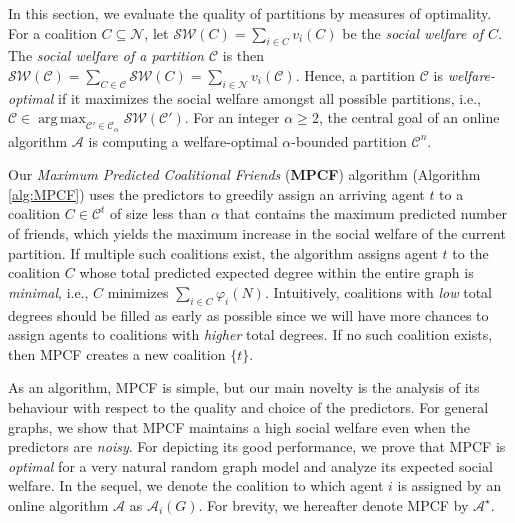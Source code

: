 \documentclass[letterpaper]{article}
\DeclareMathOperator*{\argmax}{arg\,max}
\begin{document}
In this section, we evaluate the quality of partitions by measures of optimality. For a coalition $C \subseteq \mathcal{N}$, let $\mathcal{SW}(C) = \sum_{i \in C} v_i(C)$ be the \textit{social welfare of $C$}. The \textit{social welfare of a partition $\mathcal{C}$} is then $\mathcal{SW}(\mathcal{C}) = \sum_{C \in \mathcal{C}} \mathcal{SW}(C) = \sum_{i \in \mathcal{N}} v_i(\mathcal{C})$. Hence, a partition $\mathcal{C}$ is \textit{welfare-optimal} if it maximizes the social welfare amongst all possible partitions, i.e., $\mathcal{C} \in \argmax_{\mathcal{C}' \in \mathscr{C}_\alpha} \mathcal{SW}(\mathcal{C}')$. For an integer $\alpha \geq 2$, the central goal of an online algorithm $\mathcal{A}$ is computing a welfare-optimal $\alpha$-bounded partition $\mathcal{C}^n$.


Our \textit{Maximum Predicted Coalitional Friends} (\textbf{MPCF}) algorithm (Algorithm \ref{alg:MPCF}) uses the predictors to greedily assign an arriving agent $t$ to a coalition $C \in \mathcal{C}^t$ of size less than $\alpha$ that contains the maximum predicted number of friends, which yields the maximum increase in the social welfare of the current partition. If multiple such coalitions exist, the algorithm assigns agent $t$ to the coalition $C$ whose total predicted expected degree within the entire graph is \textit{minimal}, i.e., $C$ minimizes $\sum_{i \in C} \varphi_i(N)$. Intuitively, coalitions with \textit{low} total degrees should be filled as early as possible since we will have more chances to assign agents to coalitions with \textit{higher} total degrees. If no such coalition exists, then MPCF creates a new coalition $\{t\}$.

As an algorithm, MPCF is simple, but our main novelty is the analysis of its behaviour with respect to the quality and choice of the predictors. For general graphs, we show that MPCF maintains a high social welfare even when the predictors are \textit{noisy}. For depicting its good performance, we prove that MPCF is \textit{optimal} for a very natural random graph model and analyze its expected social welfare. In the sequel, we denote the coalition to which agent $i$ is assigned by an online algorithm $\mathcal{A}$ as $\mathcal{A}_i(G)$. %
For brevity, we hereafter denote MPCF by $\mathcal{A}^\star$.
\end{document}
